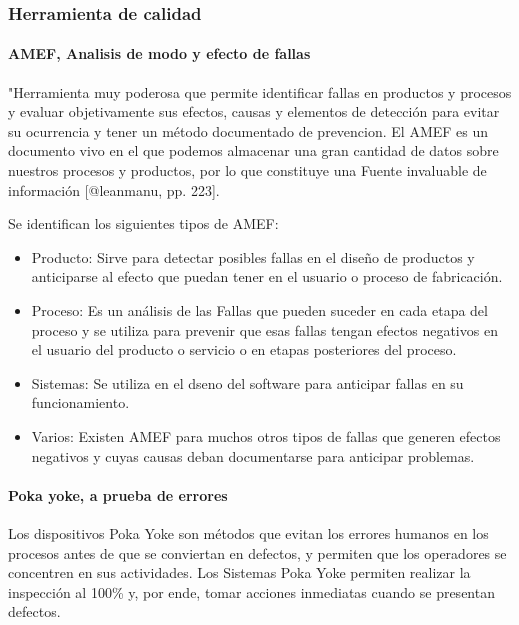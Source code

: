 \documentclass[
]{article}
\providecommand{\tightlist}{%
  \setlength{\itemsep}{0pt}\setlength{\parskip}{0pt}}
\begin{document}
\hypertarget{herramienta-de-calidad}{%
\subsubsection{Herramienta de calidad}\label{herramienta-de-calidad}}

\hypertarget{amef-analisis-de-modo-y-efecto-de-fallas}{%
\paragraph{AMEF, Analisis de modo y efecto de
fallas}\label{amef-analisis-de-modo-y-efecto-de-fallas}}

"Herramienta muy poderosa que permite identificar fallas en productos y
procesos y evaluar objetivamente sus efectos, causas y elementos de
detección para evitar su ocurrencia y tener un método documentado de
prevencion. El AMEF es un documento vivo en el que podemos almacenar una
gran cantidad de datos sobre nuestros procesos y productos, por lo que
constituye una Fuente invaluable de información {[}@leanmanu, pp.
223{]}.

Se identifican los siguientes tipos de AMEF:

\begin{itemize}
\tightlist
\item
  Producto: Sirve para detectar posibles fallas en el diseño de
  productos y anticiparse al efecto que puedan tener en el usuario o
  proceso de fabricación.
\item
  Proceso: Es un análisis de las Fallas que pueden suceder en cada etapa
  del proceso y se utiliza para prevenir que esas fallas tengan efectos
  negativos en el usuario del producto o servicio o en etapas
  posteriores del proceso.
\item
  Sistemas: Se utiliza en el d\textbar seno del software para anticipar
  fallas en su funcionamiento.
\item
  Varios: Existen AMEF para muchos otros tipos de fallas que generen
  efectos negativos y cuyas causas deban documentarse para anticipar
  problemas.
\end{itemize}

\hypertarget{poka-yoke-a-prueba-de-errores}{%
\paragraph{Poka yoke, a prueba de
errores}\label{poka-yoke-a-prueba-de-errores}}

Los dispositivos Poka Yoke son métodos que evitan los errores humanos en
los procesos antes de que se conviertan en defectos, y permiten que los
operadores se concentren en sus actividades. Los Sistemas Poka Yoke
permiten realizar la inspección al 100\% y, por ende, tomar acciones
inmediatas cuando se presentan defectos.
\end{document}
